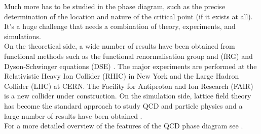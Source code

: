 Much more has to be studied in the phase diagram, such as the precise determination of the location and nature of the critical point (if it exists at all). It's a huge challenge that needs a combination of theory, experiments, and simulations. \\
On the theoretical side, a wide number of results have been obtained from functional methods such as the functional renormalisation group and (fRG) and Dyson-Schwinger equations (DSE) \cite{QCDphase,QCDphase2,Gao_2021}.
The major experiments are performed at the Relativistic Heavy Ion Collider (RHIC) in New York and the Large Hadron
Collider (LHC) at CERN. The Facility for Antiproton and Ion Research (FAIR) is a new collider under construction. On the simulation side, lattice field theory has become the standard approach to study QCD and particle physics and a large number of results have been obtained \cite{wuppertal,201915,Endroedi_2014}. \\
For a more detailed overview of the features of the QCD phase diagram see \cite{phasediag1,Bellwied2015}.
